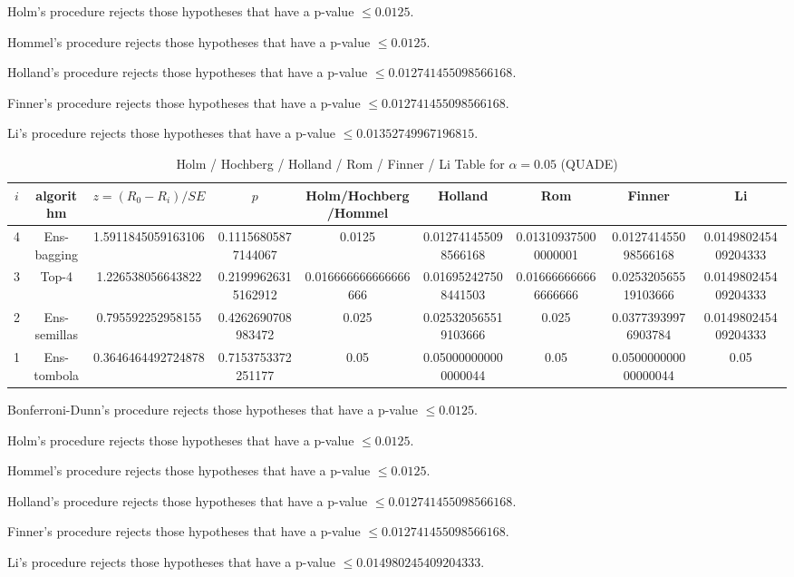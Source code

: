 \documentclass[a4paper,10pt]{article}
\begin{document}
\begin{landscape}
Holm's procedure rejects those hypotheses that have a p-value $\le0.0125$.


Hommel's procedure rejects those hypotheses that have a p-value $\le0.0125$.


Holland's procedure rejects those hypotheses that have a p-value $\le0.012741455098566168$.


Finner's procedure rejects those hypotheses that have a p-value $\le0.012741455098566168$.


Li's procedure rejects those hypotheses that have a p-value $\le0.01352749967196815$.



\newpage

\begin{table}[!htp]
\centering\scriptsize
\caption{Holm / Hochberg / Holland / Rom / Finner / Li Table for $\alpha=0.05$ (QUADE)}
\begin{tabular}{ccccccccc}
$i$&algorithm&$z=(R_0 - R_i)/SE$&$p$&Holm/Hochberg/Hommel&Holland&Rom&Finner&Li\\
\hline
4&Ens-bagging&1.5911845059163106&0.11156805877144067&0.0125&0.012741455098566168&0.013109375000000001&0.012741455098566168&0.014980245409204333\\
3&Top-4&1.226538056643822&0.21999626315162912&0.016666666666666666&0.016952427508441503&0.016666666666666666&0.025320565519103666&0.014980245409204333\\
2&Ens-semillas&0.795592252958155&0.4262690708983472&0.025&0.025320565519103666&0.025&0.03773939976903784&0.014980245409204333\\
1&Ens-tombola&0.3646464492724878&0.7153753372251177&0.05&0.050000000000000044&0.05&0.050000000000000044&0.05\\
\hline
\end{tabular}
\end{table}
Bonferroni-Dunn's procedure rejects those hypotheses that have a p-value $\le0.0125$.


Holm's procedure rejects those hypotheses that have a p-value $\le0.0125$.


Hommel's procedure rejects those hypotheses that have a p-value $\le0.0125$.


Holland's procedure rejects those hypotheses that have a p-value $\le0.012741455098566168$.


Finner's procedure rejects those hypotheses that have a p-value $\le0.012741455098566168$.


Li's procedure rejects those hypotheses that have a p-value $\le0.014980245409204333$.




\end{landscape}
\end{document}
